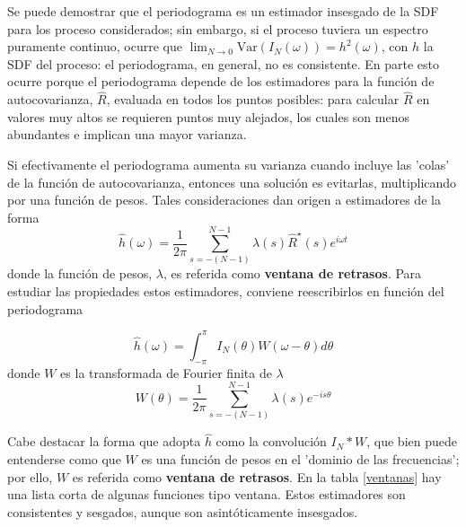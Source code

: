 \documentclass[12pt,a4paper]{mitthesis}
\newcommand{\intPI}{\int_{-\pi}^{\pi}}
\newcommand{\aste}[1]{\widehat{ #1 }^{\star}}
\newcommand{\est}[1]{\widehat{ #1 }}
\newcommand{\Var}[1]{\mathrm{Var}\left( #1 \right)}
\begin{document}
Se puede demostrar que el periodograma es un estimador insesgado de la SDF para los proceso 
considerados; sin embargo, si el proceso tuviera un espectro puramente continuo, ocurre que 
$\lim_{N\rightarrow 0} \Var{I_N(\omega)} = h^{2}(\omega)$, con $h$ la SDF del proceso: el 
periodograma, en general, no es consistente.
En parte esto ocurre porque el periodograma depende de los estimadores para la funci\'on de 
autocovarianza, $\est{R}$, evaluada en todos los puntos posibles: para calcular $\est{R}$ en 
valores muy altos se requieren puntos muy alejados, los cuales son menos abundantes e implican 
una mayor varianza.

Si efectivamente el periodograma aumenta su varianza cuando incluye las 'colas' de la funci\'on de 
autocovarianza, entonces una soluci\'on es evitarlas, multiplicando por una funci\'on de pesos. 
Tales consideraciones dan origen a estimadores de la forma
\begin{equation*}
\est{h}(\omega) = \frac{1}{2\pi} \sum_{s = -(N-1)}^{N-1} 
\lambda(s) \aste{R}(s) e^{i \omega t}
\label{ventaneando}
\end{equation*}
donde la funci\'on de pesos, $\lambda$, es referida como \textbf{ventana de retrasos}. Para estudiar 
las propiedades estos estimadores, conviene reescribirlos en funci\'on del periodograma

\begin{equation*}
\est{h}(\omega) = \intPI I_N(\theta) W(\omega-\theta) d\theta
\end{equation*}
donde $W$ es la transformada de Fourier finita de $\lambda$
\begin{equation*}
W(\theta) = \frac{1}{2\pi} \sum_{s = -(N-1)}^{N-1} \lambda(s) e^{-is\theta}
\end{equation*}

Cabe destacar la forma que adopta $\est{h}$ como la convoluci\'on $I_N \ast W$, que bien puede 
entenderse como que $W$ es una funci\'on de pesos en el 'dominio de las frecuencias'; por ello, $W$ 
es referida como \textbf{ventana de retrasos}.
En la tabla \ref{ventanas} hay una lista corta de algunas funciones tipo ventana. Estos estimadores 
son consistentes y sesgados, aunque son asint\'oticamente insesgados.
\end{document}
